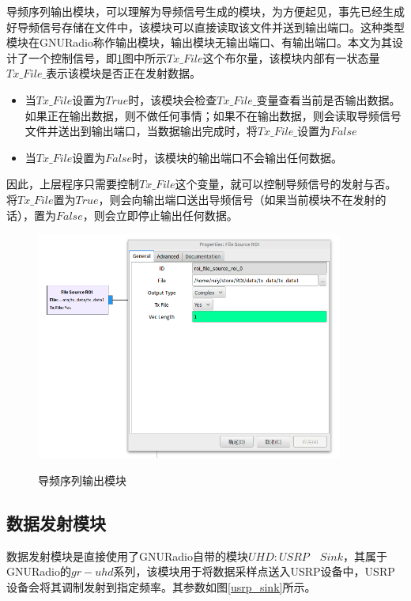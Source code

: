 \documentclass[master]{seuthesis} %
\begin{document}
\begin{Main}
导频序列输出模块，可以理解为导频信号生成的模块，为方便起见，事先已经生成好导频信号存储在文件中，该模块可以直接读取该文件并送到输出端口。这种类型模块在GNURadio称作输出模块，输出模块无输出端口、有输出端口。本文为其设计了一个控制信号，即\ref{file_source_roi}图中所示$Tx\_File$这个布尔量，该模块内部有一状态量$Tx\_File\_$表示该模块是否正在发射数据。

\begin{itemize}
    \item 当$Tx\_File$设置为$True$时，该模块会检查$Tx\_File\_$变量查看当前是否输出数据。如果正在输出数据，则不做任何事情；如果不在输出数据，则会读取导频信号文件并送出到输出端口，当数据输出完成时，将$Tx\_File\_$设置为$False$
    \item 当$Tx\_File$设置为$False$时，该模块的输出端口不会输出任何数据。
\end{itemize}

因此，上层程序只需要控制$Tx\_File$这个变量，就可以控制导频信号的发射与否。将$Tx\_File$置为$True$，则会向输出端口送出导频信号（如果当前模块不在发射的话），置为$False$，则会立即停止输出任何数据。

\begin{figure}
    \centering
    \includegraphics[width=0.9\textwidth]{images/file_source_roi}
    \caption{导频序列输出模块}{} 
    \label{file_source_roi}
\end{figure}

\subsection{数据发射模块}


数据发射模块是直接使用了GNURadio自带的模块$UHD: USRP\quad Sink$，其属于GNURadio的$gr-uhd$系列，该模块用于将数据采样点送入USRP设备中，USRP设备会将其调制发射到指定频率。其参数如图\ref{usrp_sink}所示。


\end{Main}
\end{document}
